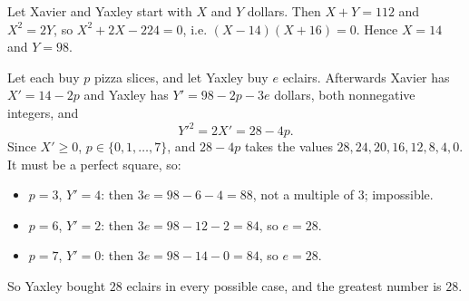 Let Xavier and Yaxley start with $X$ and $Y$ dollars. Then $X+Y=112$ and $X^2=2Y$, so $X^2+2X-224=0$, i.e. $(X-14)(X+16)=0$. Hence $X=14$ and $Y=98$.

Let each buy $p$ pizza slices, and let Yaxley buy $e$ eclairs. Afterwards Xavier has $X'=14-2p$ and Yaxley has $Y'=98-2p-3e$ dollars, both nonnegative integers, and
\[Y'^2=2X'=28-4p .\]
Since $X'\ge0$, $p\in\{0,1,\dots,7\}$, and $28-4p$ takes the values $28,24,20,16,12,8,4,0$. It must be a perfect square, so:
\begin{itemize}
\item $p=3$, $Y'=4$: then $3e=98-6-4=88$, not a multiple of $3$; impossible.
\item $p=6$, $Y'=2$: then $3e=98-12-2=84$, so $e=28$.
\item $p=7$, $Y'=0$: then $3e=98-14-0=84$, so $e=28$.
\end{itemize}
So Yaxley bought $28$ eclairs in every possible case, and the greatest number is $\boxed{28}$.

